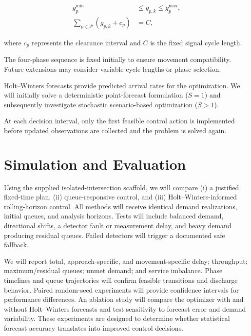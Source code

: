 \documentclass[letterpaper,12pt,conference]{ieeeconf}
\begin{document}
\begin{align}
g_p^{\min} &\leq g_{p,k}\leq g_p^{\max},\\
\sum_{p\in\mathcal P}(g_{p,k}+c_p)&=C,
\end{align}

where $c_p$ represents the clearance interval and $C$ is the fixed signal cycle length.

The four-phase sequence is fixed initially to ensure movement compatibility. Future extensions may consider variable cycle lengths or phase selection.

Holt--Winters forecasts provide predicted arrival rates for the optimization. We will initially solve a deterministic point-forecast formulation ($S=1$) and subsequently investigate stochastic scenario-based optimization ($S>1$).

At each decision interval, only the first feasible control action is implemented before updated observations are collected and the problem is solved again.

\section{Simulation and Evaluation}
Using the supplied isolated-intersection scaffold, we will compare (i) a justified fixed-time plan, (ii) queue-responsive control, and (iii) Holt--Winters-informed rolling-horizon control. All methods will receive identical demand realizations, initial queues, and analysis horizons. Tests will include balanced demand, directional shifts, a detector fault or measurement delay, and heavy demand producing residual queues. Failed detectors will trigger a documented safe fallback.

We will report total, approach-specific, and movement-specific delay; throughput; maximum/residual queues; unmet demand; and service imbalance. Phase timelines and queue trajectories will confirm feasible transitions and discharge behavior. Paired random-seed experiments will provide confidence intervals for performance differences. An ablation study will compare the optimizer with and without Holt--Winters forecasts and test sensitivity to forecast error and demand variability. These experiments are designed to determine whether statistical forecast accuracy translates into improved control decisions.



\end{document}
